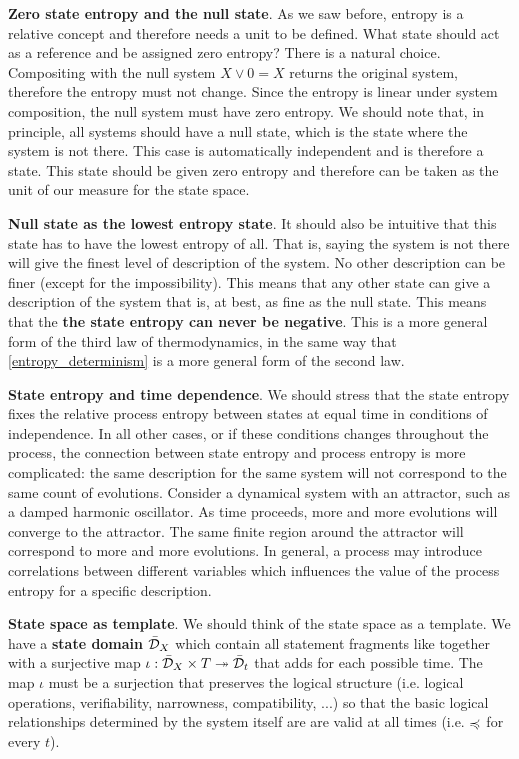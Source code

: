\documentclass[10pt, onecolumn, longbibliography, nofootinbib]{revtex4-2}
\begin{document}
\textbf{Zero state entropy and the null state}. As we saw before, entropy is a relative concept and therefore needs a unit to be defined. What state should act as a reference and be assigned zero entropy? There is a natural choice. Compositing with the null system $X \vee 0 = X$ returns the original system, therefore the entropy must not change. Since the entropy is linear under system composition, the null system must have zero entropy. We should note that, in principle, all systems should have a null state, which is the state where the system is not there. This case is automatically independent and is therefore a state. This state should be given zero entropy and therefore can be taken as the unit of our measure for the state space.

\textbf{Null state as the lowest entropy state}. It should also be intuitive that this state has to have the lowest entropy of all. That is, saying the system is not there will give the finest level of description of the system. No other description can be finer (except for the impossibility). This means that any other state can give a description of the system that is, at best, as fine as the null state. This means that the \textbf{the state entropy can never be negative}. This is a more general form of the third law of thermodynamics, in the same way that \ref{entropy_determinism} is a more general form of the second law.

\textbf{State entropy and time dependence}. We should stress that the state entropy fixes the relative process entropy between states at equal time in conditions of independence. In all other cases, or if these conditions changes throughout the process, the connection between state entropy and process entropy is more complicated: the same description for the same system will not correspond to the same count of evolutions. Consider a dynamical system with an attractor, such as a damped harmonic oscillator. As time proceeds, more and more evolutions will converge to the attractor. The same finite region around the attractor will correspond to more and more evolutions. In general, a process may introduce correlations between different variables which influences the value of the process entropy for a specific description.

\textbf{State space as template}. We should think of the state space as a template. We have a \textbf{state domain} $\bar{\mathcal{D}}_{X}$ which contain all statement fragments like  together with a surjective map $\iota : \bar{\mathcal{D}}_{X} \times T \twoheadrightarrow \bar{\mathcal{D}}_t$ that adds  for each possible time. The map $\iota$ must be a surjection that preserves the logical structure (i.e. logical operations, verifiability, narrowness, compatibility, ...) so that the basic logical relationships determined by the system itself are are valid at all times (i.e.  $\preccurlyeq$  for every $t$).
\end{document}

